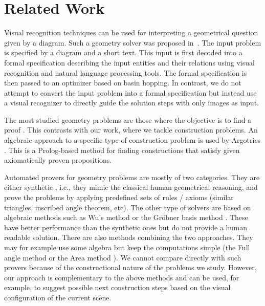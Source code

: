 \section{Related Work}
\label{sec:related}
Visual recognition techniques can be used for interpreting a
geometrical question given by a diagram. Such a geometry solver was proposed in~\cite{allen1,allen2}. The input problem is specified by a diagram and a short text. This input is first decoded into a formal specification describing the input entities and their relations using visual recognition and natural language processing tools.  The formal specification is then passed to an optimizer based on basin hopping.
In contrast, we do not attempt to convert the input problem into a formal specification but instead use a visual recognizer to directly guide the solution steps with only images as input.

The most studied geometry problems are those where the objective is to
find a proof \cite{TGTP}. This contrasts with our work, where
we tackle construction problems. An algebraic approach to a specific
type of construction problem
is used by Argotrics \cite{Argotics}. This is
a Prolog-based method for finding constructions that satisfy
given axiomatically proven propositions.



Automated provers for geometry problems are mostly of two
categories. They are either synthetic \cite{synth1,synth2},
i.e., they mimic the classical
human geometrical reasoning, and prove the problems by applying
predefined sets of rules / axioms (similar triangles, inscribed angle
theorem, etc). The other type of solvers are based on algebraic methods
such as Wu's method \cite{wu} or the Gröbner basis method \cite{grobner}.
These have better performance
than the synthetic ones but do not provide a human readable
solution. There are also methods combining the two approaches. They may for example use some algebra
but keep the computations simple (the Full angle method or
the Area method \cite{AreaBook}). We cannot compare directly with such provers
because of the constructional nature of the problems we study. 
However, our approach is complementary to the above methods and can be used, for example, to suggest possible next construction steps based on the visual configuration of the current scene.

